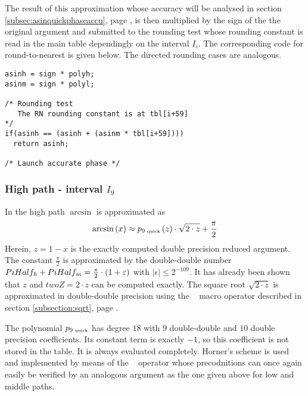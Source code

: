 The result of this approximation whose accuracy will be analysed in
section \ref{subsec:asinquickphaseaccu}, page
\pageref{subsec:asinquickphaseaccu}, is then multiplied by the sign of
the the original argument and submitted to the rounding test whose
rounding constant is read in the main table dependingly on the
interval $I_i$. The corresponding code for round-to-nearest is given
below. The directed rounding cases are analogous.
\begin{lstlisting}[caption={Middle path quick phase rounding test},firstnumber=1]
asinh = sign * polyh;
asinm = sign * polyl;

/* Rounding test
   The RN rounding constant is at tbl[i+59]
*/
if(asinh == (asinh + (asinm * tbl[i+59])))
  return asinh;

/* Launch accurate phase */
\end{lstlisting}

\subsubsection{High path - interval $I_9$}
In the high path $\arcsin$ is approximated as
$$\arcsin\left( x \right) \approx p_{9\mbox{\tiny ~quick}}\left( z \right) \cdot \sqrt{2 \cdot z} + \frac{\pi}{2}$$
Herein, $z = 1 - x$ is the exactly computed double precision reduced
argument. The constant $\frac{\pi}{2}$ is approximated by the
double-double number $PiHalf_{\mathit{h}} + PiHalf_{\mathit{m}} = \frac{\pi}{2} \cdot
\left( 1 + \varepsilon \right)$ with $\left \vert \epsilon \right \vert
\leq 2^{-109}$. It has already been shown that $z$ and $twoZ = 2 \cdot
z$ can be computed exactly. The square root $\sqrt{2 \cdot z}$ is
approximated in double-double precision using the \SqrtD~ macro
operator described in section \ref{subsection:sqrt}, page
\pageref{subsection:sqrt}.

The polynomial $p_{9\mbox{\tiny ~quick}}$ has degree $18$ with $9$
double-double and $10$ double precision coefficients. Its constant
term is exactly $-1$, so this coefficient is not stored in the table.
It is always evaluated completely. Horner's scheme is used and
implemented by means of the \MulAddDdD~ operator whose precodnitions
can once again easily be verified by an analogous argument as the one
given above for low and middle paths.

